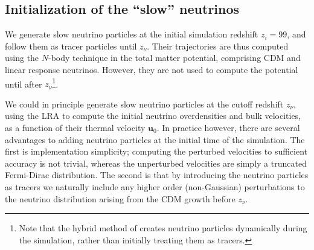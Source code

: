 \documentclass[useAMS, usenatbib]{mnras}
\newcommand{\barr}{\begin{eqnarray}}
\newcommand{\earr}{\end{eqnarray}}
\newcommand{\bs}{\boldsymbol}
\begin{document}


%



\subsection{Initialization of the ``slow'' neutrinos}

We generate slow neutrino particles at the initial simulation redshift $z_i = 99$, and follow them as tracer particles until $z_\nu$. Their trajectories are thus computed using the $N$-body technique in the total matter potential, comprising CDM and linear response neutrinos. However, they are not used to compute the potential until after $z_\nu$\footnote{Note that the hybrid method of \cite{Brandbyge_2010} creates neutrino particles dynamically during the simulation, rather than initially treating them as tracers.}.

We could in principle generate slow neutrino particles at the cutoff redshift $z_\nu$, using the LRA to compute the initial neutrino overdensities and bulk velocities, as a function of their thermal velocity $\bs{u}_0$. In practice however, there are several advantages to adding neutrino particles at the initial time of the simulation. The first is implementation simplicity; computing the perturbed velocities to sufficient accuracy is not trivial, whereas the unperturbed velocities are simply a truncated Fermi-Dirac distribution. The second is that by introducing the neutrino particles as tracers we naturally include any higher order (non-Gaussian) perturbations to the neutrino distribution arising from the CDM growth before $z_\nu$.
\end{document}
